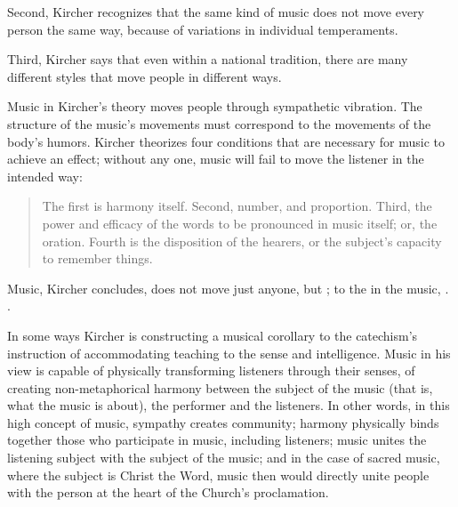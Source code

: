 Second, Kircher recognizes that the same kind of music does not move every person the same way, because of variations in individual temperaments.

Third, Kircher says that even within a national tradition, there are many different styles that move people in different ways.

Music in Kircher's theory moves people through sympathetic vibration.
The structure of the music's movements must correspond to the movements of the body's humors.
Kircher theorizes four conditions that are necessary for music to achieve an effect; without any one, music will fail to move the listener in the intended way:
\begin{quote}
  The first is harmony itself.
  Second, number, and proportion.
  Third, the power and efficacy of the words to be pronounced in music itself; or, the oration.
  Fourth is the disposition of the hearers, or the subject's capacity to remember things. 
\end{quote}
Music, Kircher concludes, does not move just anyone, but ;  to the  in the music, . %
. %

In some ways Kircher is constructing a musical corollary to the catechism's instruction of accommodating teaching to the sense and intelligence.
Music in his view is capable of physically transforming listeners through their senses, of creating non-metaphorical harmony between the subject of the music (that is, what the music is about), the performer and the listeners.
In other words, in this high concept of music, sympathy creates community; harmony physically binds together those who participate in music, including listeners; music unites the listening subject with the subject of the music; and in the case of sacred music, where the subject is Christ the Word, music then would directly unite people with the person at the heart of the Church's proclamation.

